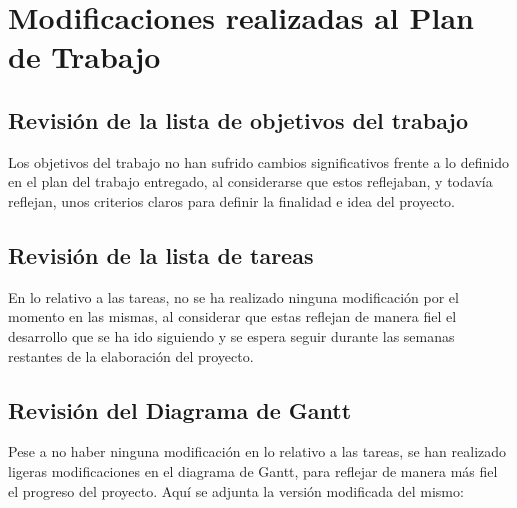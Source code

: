 \chapter{Modificaciones realizadas al Plan de Trabajo} \label{chp:intro}

\section{Revisión de la lista de objetivos del trabajo}

Los objetivos del trabajo no han sufrido cambios significativos frente a lo definido en el plan del trabajo entregado, al considerarse que estos reflejaban, y todavía reflejan, unos criterios claros para definir la finalidad e idea del proyecto.

\section{Revisión de la lista de tareas}
En lo relativo a las tareas, no se ha realizado ninguna modificación por el momento en las mismas, al considerar que estas reflejan de manera fiel el desarrollo que se ha ido siguiendo y se espera seguir durante las semanas restantes de la elaboración del proyecto.
\section{Revisión del Diagrama de Gantt}

Pese a no haber ninguna modificación en lo relativo a las tareas, se han realizado ligeras modificaciones en el diagrama de Gantt, para reflejar de manera más fiel  el progreso del proyecto. Aquí se adjunta la versión modificada del mismo:

\begin{landscape}

\end{landscape}


